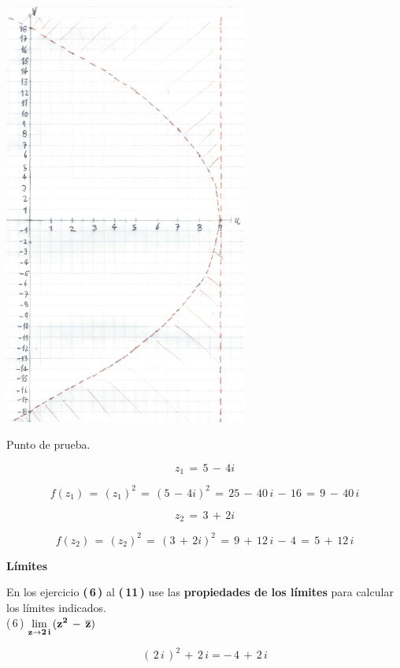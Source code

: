\documentclass[a4paper,11pt,openany]{book}
\begin{document}
\begin{center}
     \includegraphics[width=8cm]{Mapeo-Ej-5-w.png}
\end{center}

\newpage

\textcolor{ao(english)}{} Punto de prueba.

$$z_{1}\,=\,5\,-\,4i$$

$$f(z_{1})\,=\,(z_{1})^{2}\,=\,(5\,-\,4i)^{2}\,=\,25\,-\,40\,i\,-\,16\,=\,9\,-\,40\,i$$


$$z_{2}\,=\,3\,+\,2i$$

$$f(z_{2})\,=\,(z_{2})^{2}\,=\,(3\,+\,2i)^{2}\,=\,9\,+\,12\,i\,-\,4\,=\,5\,+\,12\,i$$

\begin{center}
\textbf{Límites}
\end{center}

En los ejercicio \textbf{(\,6\,)} al \textbf{(\,11\,)} use las \textbf{propiedades de los límites} para calcular los límites indicados.\\

\textcolor{ao(english)}{(\,6\,)} $\bf{\displaystyle\lim_{z \to 2\,i}\,(z^{2}\,-\,\overline{z})}$

$$ (\,2\,i\,)^{2}\,+\,2\,i = \boxed{-\,4\,+\,2\,i}$$
\end{document}
